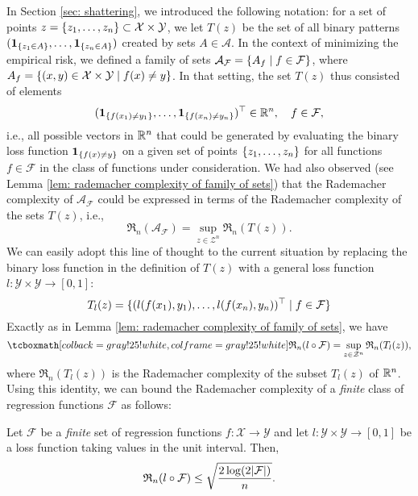 In Section \ref{sec: shattering}, we introduced the following notation: for a set of points $z = \set{z_1, \dots, z_n} \subset \mathcal{X} \times \mathcal{Y}$, we let $T(z)$ be the set of all binary patterns $(\indSet{z_1 \in A}, \dots, \indSet{z_n \in A})$ created by sets $A \in \mathcal{A}$. In the context of minimizing the empirical risk, we defined a family of sets $\mathcal{A}_{\mathcal{F}} = \set{A_f \with f \in \mathcal{F}}$, where $A_f = \set{(x, y) \in \mathcal{X} \times \mathcal{Y} \with f(x) \neq y}$. In that setting, the set $T(z)$ thus consisted of elements
\[
    (\indSet{f(x_1) \neq y_1}, \dots, \indSet{f(x_n) \neq y_n})^{\top} \in \R^n, \quad f \in \mathcal{F},
\]
i.e., all possible vectors in $\mathbb{R}^n$ that could be generated by evaluating the binary loss function $\indSet{f(x) \neq y}$ on a given set of points $\set{z_1, \dots, z_n}$ for all functions $f \in \mathcal{F}$ in the class of functions under consideration. We had also observed (see Lemma \ref{lem: rademacher complexity of family of sets}) that the Rademacher complexity of $\mathcal{A}_{\mathcal{F}}$ could be expressed in terms of the Rademacher complexity of the sets $T(z)$, i.e.,
\[
    \mathfrak{R}_n(\mathcal{A}_{\mathcal{F}}) = \sup_{z \in \mathcal{Z}^n} \mathfrak{R}_n(T(z)).
\]
We can easily adopt this line of thought to the current situation by replacing the binary loss function in the definition of $T(z)$ with a general loss function $l \colon \mathcal{Y} \times \mathcal{Y} \to [0, 1]$:
\begin{equation}
    T_l(z) = \{(l(f(x_1), y_1), \dots, l(f(x_n), y_n))^{\top} \mathrel{|} f \in \mathcal{F}\}
\end{equation}
Exactly as in Lemma \ref{lem: rademacher complexity of family of sets}, we have
\begin{equation}
\label{eq: rademacher complexity for general loss}
    \highlightMath{
        \mathfrak{R}_n(l \circ \mathcal{F}) = \sup_{z \in \mathcal{Z}^n} \mathfrak{R}_n(T_l(z)),
    }
\end{equation}
where $\mathfrak{R}_n(T_l(z))$ is the Rademacher complexity of the subset $T_l(z)$ of $\mathbb{R}^n$. Using this identity, we can bound the Rademacher complexity of a \emph{finite} class of regression functions $\mathcal{F}$ as follows:

\begin{proposition}
\label{prop: bound on rademacher complexity for general loss}
Let $\mathcal{F}$ be a \emph{finite} set of regression functions $f \colon \mathcal{X} \to \mathcal{Y}$ and let $l \colon \mathcal{Y} \times \mathcal{Y} \to [0, 1]$ be a loss function taking values in the unit interval. Then,
\[
    \mathfrak{R}_n(l \circ \mathcal{F}) \leq \sqrt{\frac{2 \log(2 \abs{\mathcal{F}})}{n}}.
\]
\end{proposition}

